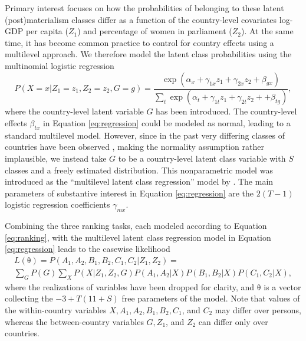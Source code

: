 \documentclass[letterpaper,12pt]{article}
\newcommand\vm[1]{%
\bm{\mathrm{#1}}}
\newcommand{\param}{\vm{\theta}}
\begin{document}
Primary interest focuses on how the probabilities of belonging to these latent (post)materialism classes differ as a function of the country-level covariates log-GDP per capita ($Z_1$) and percentage of women in parliament ($Z_2$).  At the same time, it has become common practice to control for country effects using a multilevel approach. We therefore model the latent class probabilities using the multinomial logistic regression
\begin{equation}
P(X = x| Z_1 = z_1, Z_2 = z_2, G = g) = \frac{\exp(\alpha_x + \gamma_{1x} z_1 +\gamma_{2x} z_2  + \beta_{gx})}
					{\sum_t \exp(\alpha_t + \gamma_{1t} z_1 +  \gamma_{2t} z_2 +  + \beta_{tg})},
					\label{eq:regression}
\end{equation}
where the country-level latent variable $G$ has been introduced. The country-level effects $\beta_{tx}$ in Equation \ref{eq:regression} could be modeled as normal, leading to a standard multilevel model. However, since in the past very differing classes of countries have been observed \citep{moors2007heterogeneity}, making the normality assumption rather implausible, we instead take $G$ to be a country-level latent class variable with $S$ classes and a freely estimated distribution. This nonparametric model was introduced as the ``multilevel latent class regression'' model by \citet{vermunt2003multilevel}. The main parameters of substantive interest in Equation \ref{eq:regression} are the $2  (T - 1)$ logistic regression coefficients $\gamma_{mx}$.



Combining the three ranking tasks, each modeled according to Equation \ref{eq:ranking}, with the multilevel latent class regression model in Equation \ref{eq:regression} leads to the casewise likelihood
\begin{multline}
L(\param) = 
	P(A_1, A_2, 
		B_1, B_2, 
		C_1, C_2 | Z_1, Z_2) = \\
	\sum_{G} P(G)	\sum_{X} P(X | Z_1, Z_2, G)
				P(A_1, A_2 | X)
				P(B_1, B_2 | X) 
				P(C_1, C_2 | X),
				\label{eq:lik}
\end{multline}
where the realizations of variables have been dropped for clarity, and $\param$ is a vector collecting the $-3 + T (11 + S) $ free parameters of the model.
Note that values of the within-country variables $X, A_1, A_2, B_1, B_2, C_1$, and $C_2$ may differ over persons, whereas the between-country variables $G, Z_1$, and $Z_2$ can differ only over countries. 
\end{document}
